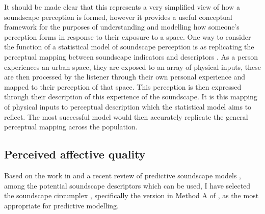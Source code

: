 It should be made clear that this represents a very simplified view of how a soundscape perception is formed, however it provides a useful conceptual framework for the purposes of understanding and modelling how someone's perception forms in response to their exposure to a space. One way to consider the function of a statistical model of soundscape perception is as replicating the perceptual mapping between soundscape indicators and descriptors \citep{Lionello2021Thesis}. As a person experiences an urban space, they are exposed to an array of physical inputs, these are then processed by the listener through their own personal experience and mapped to their perception of that space. This perception is then expressed through their description of this experience of the soundscape. It is this mapping of physical inputs to perceptual description which the statistical model aims to reflect. The most successful model would then accurately replicate the general perceptual mapping across the population.





\subsection{Perceived affective quality}
\label{sec:paqReview}
Based on the work in \citet{Aletta2016Soundscape} and a recent review of predictive soundscape models \citep{Lionello2020systematic}, among the potential soundscape descriptors which can be used, I have selected the soundscape circumplex \citep{Axelsson2010principal}, specifically the version in Method A of \citet{ISO12913Part2}, as the most appropriate for predictive modelling. 

